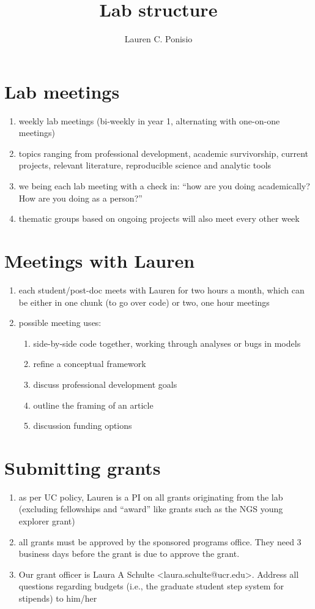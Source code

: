 \documentclass[12pt]{article}
\title{Lab structure}
\author{Lauren C. Ponisio}
\begin{document}
\maketitle

\section{Lab meetings}
\begin{enumerate}
\item weekly lab meetings (bi-weekly in year 1, alternating with
  one-on-one meetings)
\item topics ranging from professional development, academic
  survivorship, current projects, relevant literature, reproducible
  science and analytic tools
\item we being each lab meeting with a check in: ``how are you doing
  academically? How are you doing as a person?'' 
\item thematic groups based on ongoing projects will also meet every
  other week
\end{enumerate}

\section{Meetings with Lauren}
\begin{enumerate}
\item each student/post-doc meets with Lauren for two hours a month,
  which can be either in one chunk (to go over code) or two, one hour
  meetings
\item possible meeting uses:
  \begin{enumerate}
  \item side-by-side code together, working through analyses or bugs
    in models
  \item refine a conceptual framework
  \item discuss professional development goals
  \item outline the framing of an article
  \item discussion funding options
  \end{enumerate}
\end{enumerate}

\section{Submitting grants}
\begin{enumerate}
\item as per UC policy, Lauren is a PI on all grants originating from
  the lab (excluding fellowships and ``award'' like grants such as the
  NGS young explorer grant)
\item all grants must be approved by the sponsored programs
  office. They need 3 business days before the grant is due to
  approve the grant. 
\item Our grant officer is Laura A Schulte
  <laura.schulte@ucr.edu>. Address all questions regarding budgets
  (i.e., the graduate student step system for stipends) to him/her
\end{enumerate}
\end{document}

